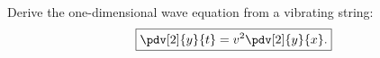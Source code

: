 \TODO\quad Derive the one-dimensional wave equation from a vibrating string:
\begin{equation}
\boxed{\pdv[2]{y}{t}=v^2\pdv[2]{y}{x}.}
\end{equation}
